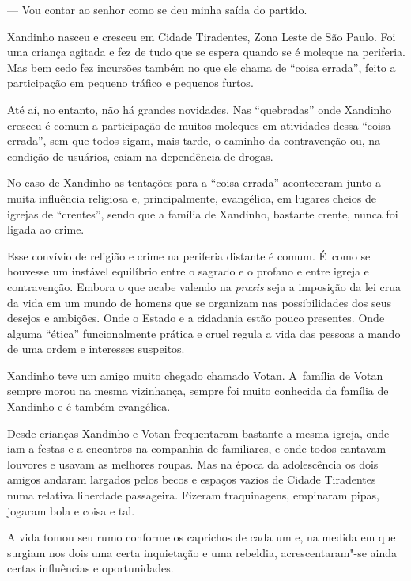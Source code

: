 — Vou contar ao senhor como se deu minha saída do partido.

\asterisc{}

Xandinho nasceu e cresceu em Cidade Tiradentes, Zona Leste de São Paulo.
Foi uma criança agitada e fez de tudo que se espera quando se é moleque
na periferia. Mas bem cedo fez incursões também no que ele chama de
``coisa errada'', feito a participação em pequeno tráfico e pequenos
furtos.

Até aí, no entanto, não há grandes novidades. Nas ``quebradas'' onde
Xandinho cresceu é comum a participação de muitos moleques em atividades
dessa ``coisa errada'', sem que todos sigam, mais tarde, o caminho da
contravenção ou, na condição de usuários, caiam na dependência de
drogas.

No caso de Xandinho as tentações para a ``coisa errada'' aconteceram
junto a muita influência religiosa e, principalmente, evangélica, em
lugares cheios de igrejas de ``crentes'', sendo que a família de
Xandinho, bastante crente, nunca foi ligada ao crime.

Esse convívio de religião e crime na periferia distante é comum. É~como
se houvesse um instável equilíbrio entre o sagrado e o profano e entre
igreja e contravenção. Embora o que acabe valendo na \emph{praxis} seja
a imposição da lei crua da vida em um mundo de homens que se organizam
nas possibilidades dos seus desejos e ambições. Onde o Estado e a
cidadania estão pouco presentes. Onde alguma ``ética'' funcionalmente
prática e cruel regula a vida das pessoas a mando de uma ordem e
interesses suspeitos.

\asterisc{}

Xandinho teve um amigo muito chegado chamado Votan. A~família de Votan
sempre morou na mesma vizinhança, sempre foi muito conhecida da família
de Xandinho e é também evangélica.

Desde crianças Xandinho e Votan frequentaram bastante a mesma igreja,
onde iam a festas e a encontros na companhia de familiares, e onde todos
cantavam louvores e usavam as melhores roupas. Mas na época da
adolescência os dois amigos andaram largados pelos becos e espaços
vazios de Cidade Tiradentes numa relativa liberdade passageira. Fizeram
traquinagens, empinaram pipas, jogaram bola e coisa e tal.

A vida tomou seu rumo conforme os caprichos de cada um e, na medida em
que surgiam nos dois uma certa inquietação e uma rebeldia,
acrescentaram"-se ainda certas influências e oportunidades.

